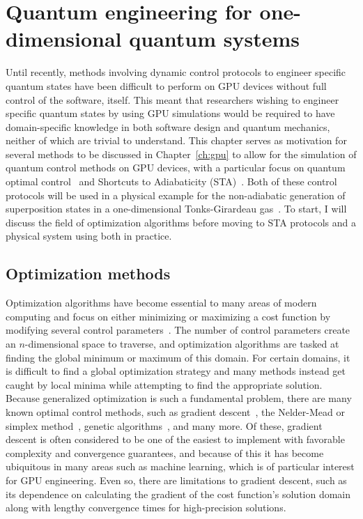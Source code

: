 \chapter{Quantum engineering for one-dimensional quantum systems}
\label{ch:1d}

Until recently, methods involving dynamic control protocols to engineer specific quantum states have been difficult to perform on GPU devices without full control of the software, itself.
This meant that researchers wishing to engineer specific quantum states by using GPU simulations would be required to have domain-specific knowledge in both software design and quantum mechanics, neither of which are trivial to understand.
This chapter serves as motivation for several methods to be discussed in Chapter~\ref{ch:gpu} to allow for the simulation of quantum control methods on GPU devices, with a particular focus on quantum optimal control~\cite{werschnik2007} and Shortcuts to Adiabaticity (STA)~\cite{guery2019}.
Both of these control protocols will be used in a physical example for the non-adiabatic generation of superposition states in a one-dimensional Tonks-Girardeau gas~\cite{schloss2016}.
To start, I will discuss the field of optimization algorithms before moving to STA protocols and a physical system using both in practice.

\section{Optimization methods}

Optimization algorithms have become essential to many areas of modern computing and focus on either minimizing or maximizing a cost function by modifying several control parameters~\cite{lewis2012}.
The number of control parameters create an $n$-dimensional space to traverse, and optimization algorithms are tasked at finding the global minimum or maximum of this domain.
For certain domains, it is difficult to find a global optimization strategy and many methods instead get caught by local minima while attempting to find the appropriate solution.
Because generalized optimization is such a fundamental problem, there are many known optimal control methods, such as gradient descent~\cite{ruder2016}, the Nelder-Mead or simplex method~\cite{nelder1965}, genetic algorithms~\cite{koza1997}, and many more.
Of these, gradient descent is often considered to be one of the easiest to implement with favorable complexity and convergence guarantees, and because of this it has become ubiquitous in many areas such as machine learning, which is of particular interest for GPU engineering. 
Even so, there are limitations to gradient descent, such as its dependence on calculating the gradient of the cost function's solution domain along with lengthy convergence times for high-precision solutions.

